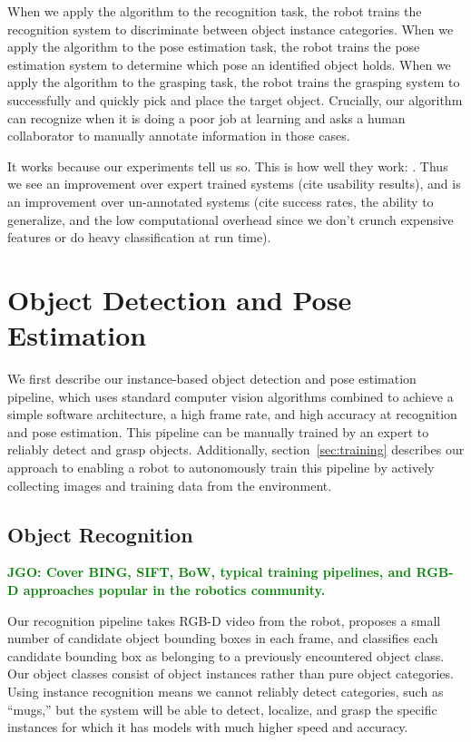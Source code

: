\documentclass[conference]{IEEEtran}
\newcommand{\jgonote}[1]{\textcolor{Green}{\textbf{JGO: #1}}}
\begin{document}
When we apply the algorithm to the recognition task, the robot trains
the recognition system to discriminate between object instance
categories. When we apply the algorithm to the pose estimation task,
the robot trains the pose estimation system to determine which pose an
identified object holds.  When we apply the algorithm to the grasping
task, the robot trains the grasping system to successfully and quickly
pick and place the target object.  Crucially, our algorithm can
recognize when it is doing a poor job at learning and asks a human
collaborator to manually annotate information in those cases.



It works because our experiments tell us so. This is how well they
work: .  Thus we see an improvement over expert trained systems (cite
usability results), and is an improvement over un-annotated systems
(cite success rates, the ability to generalize, and the low
computational overhead since we don't crunch expensive features or do
heavy classification at run time).



\section{Object Detection and Pose Estimation}

We first describe our instance-based object detection and pose
estimation pipeline, which uses standard computer vision algorithms
combined to achieve a simple software architecture, a high frame rate,
and high accuracy at recognition and pose estimation.  This pipeline
can be manually trained by an expert to reliably detect and grasp
objects.  Additionally, section~\ref{sec:training} describes our
approach to enabling a robot to autonomously train this pipeline by
actively collecting images and training data from the environment.

\subsection{Object Recognition}
\jgonote{Cover BING, SIFT, BoW, typical training pipelines, and RGB-D
  approaches popular in the robotics community.} 

Our recognition pipeline takes RGB-D video from the robot, proposes a
small number of candidate object bounding boxes in each frame, and
classifies each candidate bounding box as belonging to a previously
encountered object class. Our object classes consist of object
instances rather than pure object categories.  Using instance
recognition means we cannot reliably detect categories, such as
``mugs,'' but the system will be able to detect, localize, and grasp
the specific instances for which it has models with much higher speed
and accuracy.
\end{document}
